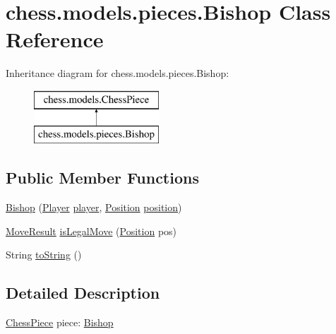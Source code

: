 \hypertarget{classchess_1_1models_1_1pieces_1_1_bishop}{}\section{chess.\+models.\+pieces.\+Bishop Class Reference}
\label{classchess_1_1models_1_1pieces_1_1_bishop}
Inheritance diagram for chess.\+models.\+pieces.\+Bishop\+:\begin{figure}[H]
\begin{center}
\leavevmode
\includegraphics[height=2.000000cm]{classchess_1_1models_1_1pieces_1_1_bishop}
\end{center}
\end{figure}
\subsection*{Public Member Functions}
\begin{DoxyCompactItemize}
\item 
\mbox{\hyperlink{classchess_1_1models_1_1pieces_1_1_bishop_a9abc7cf53fde3e6ec5f8af6fbc7b005d}{Bishop}} (\mbox{\hyperlink{enumchess_1_1models_1_1enums_1_1_player}{Player}} \mbox{\hyperlink{classchess_1_1models_1_1_chess_piece_a3bcc8a24667318b5aab8c146adcc3eb7}{player}}, \mbox{\hyperlink{classchess_1_1models_1_1_position}{Position}} \mbox{\hyperlink{classchess_1_1models_1_1_chess_piece_a0e4f8616b75e548f269d3971846396f3}{position}})
\item 
\mbox{\hyperlink{enumchess_1_1models_1_1enums_1_1_move_result}{Move\+Result}} \mbox{\hyperlink{classchess_1_1models_1_1pieces_1_1_bishop_ae5a545cda22d44b4c4cbfeebab5c0853}{is\+Legal\+Move}} (\mbox{\hyperlink{classchess_1_1models_1_1_position}{Position}} pos)
\item 
String \mbox{\hyperlink{classchess_1_1models_1_1pieces_1_1_bishop_abbdf19ca47acb189eeaa49931eb2f30c}{to\+String}} ()
\end{DoxyCompactItemize}


\subsection{Detailed Description}
\mbox{\hyperlink{classchess_1_1models_1_1_chess_piece}{Chess\+Piece}} piece\+: \mbox{\hyperlink{classchess_1_1models_1_1pieces_1_1_bishop}{Bishop}} 

